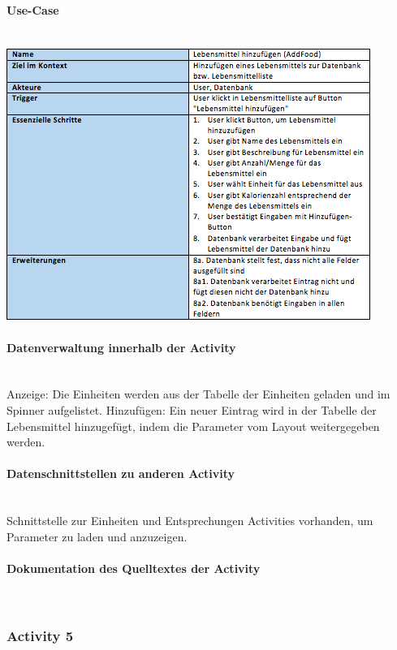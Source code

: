 \paragraph{Use-Case}$~~$\\
\newline
\includegraphics[scale=1]{img/usecaseaddfood}\\
\paragraph{Datenverwaltung innerhalb der Activity}\\
Anzeige: Die Einheiten werden aus der Tabelle der Einheiten geladen und im Spinner aufgelistet. 
Hinzufügen: Ein neuer Eintrag wird in der Tabelle der Lebensmittel hinzugefügt, indem die Parameter vom Layout weitergegeben werden. 

\paragraph{Datenschnittstellen zu anderen Activity}\\
Schnittstelle zur Einheiten und Entsprechungen Activities vorhanden, um Parameter zu laden und anzuzeigen. 

\paragraph{Dokumentation des Quelltextes der Activity}\\

\subsubsection{Activity 5}

